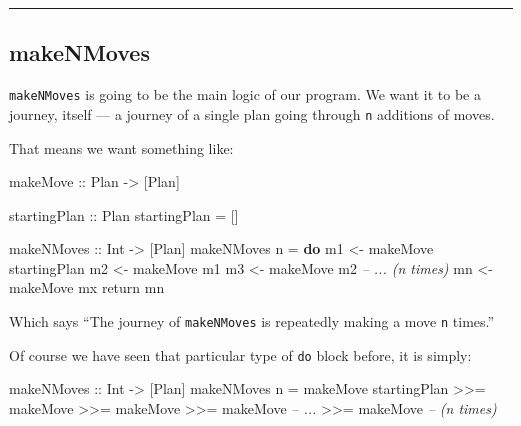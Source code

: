 \documentclass[]{article}
\newenvironment{Shaded}{}{}
\newcommand{\CommentTok}[1]{\textcolor[rgb]{0.38,0.63,0.69}{\textit{#1}}}
\newcommand{\DataTypeTok}[1]{\textcolor[rgb]{0.56,0.13,0.00}{#1}}
\newcommand{\FunctionTok}[1]{\textcolor[rgb]{0.02,0.16,0.49}{#1}}
\newcommand{\KeywordTok}[1]{\textcolor[rgb]{0.00,0.44,0.13}{\textbf{#1}}}
\newcommand{\NormalTok}[1]{#1}
\newcommand{\OtherTok}[1]{\textcolor[rgb]{0.00,0.44,0.13}{#1}}
\begin{document}
\begin{center}\rule{0.5\linewidth}{\linethickness}\end{center}

\hypertarget{makenmoves}{%
\subsection{makeNMoves}\label{makenmoves}}

\texttt{makeNMoves} is going to be the main logic of our program. We want it to
be a journey, itself --- a journey of a single plan going through \texttt{n}
additions of moves.

That means we want something like:

\begin{Shaded}
\begin{Highlighting}[]
\OtherTok{makeMove ::} \DataTypeTok{Plan} \OtherTok{->}\NormalTok{ [}\DataTypeTok{Plan}\NormalTok{]}

\OtherTok{startingPlan ::} \DataTypeTok{Plan}
\NormalTok{startingPlan }\FunctionTok{=}\NormalTok{ []}

\OtherTok{makeNMoves ::} \DataTypeTok{Int} \OtherTok{->}\NormalTok{ [}\DataTypeTok{Plan}\NormalTok{]}
\NormalTok{makeNMoves n }\FunctionTok{=} \KeywordTok{do}
\NormalTok{    m1 }\OtherTok{<-}\NormalTok{ makeMove startingPlan}
\NormalTok{    m2 }\OtherTok{<-}\NormalTok{ makeMove m1}
\NormalTok{    m3 }\OtherTok{<-}\NormalTok{ makeMove m2}
    \CommentTok{-- ... (n times)}
\NormalTok{    mn }\OtherTok{<-}\NormalTok{ makeMove mx}
\NormalTok{    return mn}
\end{Highlighting}
\end{Shaded}

Which says ``The journey of \texttt{makeNMoves} is repeatedly making a move
\texttt{n} times.''

Of course we have seen that particular type of \texttt{do} block before, it is
simply:

\begin{Shaded}
\begin{Highlighting}[]
\OtherTok{makeNMoves ::} \DataTypeTok{Int} \OtherTok{->}\NormalTok{ [}\DataTypeTok{Plan}\NormalTok{]}
\NormalTok{makeNMoves n }\FunctionTok{=}
\NormalTok{    makeMove startingPlan }\FunctionTok{>>=}\NormalTok{ makeMove}
        \FunctionTok{>>=}\NormalTok{ makeMove }\FunctionTok{>>=}\NormalTok{ makeMove   }\CommentTok{-- ...}
        \FunctionTok{>>=}\NormalTok{ makeMove                }\CommentTok{-- (n times)}
\end{Highlighting}
\end{Shaded}
\end{document}
